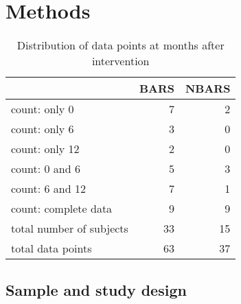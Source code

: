 \documentclass[
]{article}
\begin{document}
\newpage

\hypertarget{methods}{%
\section{Methods}\label{methods}}

\begin{table}

\caption{\label{tab:tableSample}Distribution of data points at months after intervention}
\centering
\begin{tabular}[t]{lrr}
\toprule
  & BARS & NBARS\\
\midrule
count: only 0 & 7 & 2\\
count: only 6 & 3 & 0\\
count: only 12 & 2 & 0\\
count: 0 and 6 & 5 & 3\\
count: 6 and 12 & 7 & 1\\
count: complete data & 9 & 9\\
total number of subjects & 33 & 15\\
total data points & 63 & 37\\
\bottomrule
\end{tabular}
\end{table}

\hypertarget{sample-and-study-design}{%
\subsection{Sample and study design}\label{sample-and-study-design}}
\end{document}
